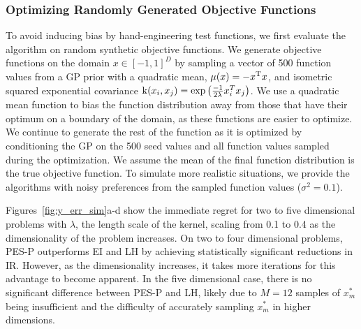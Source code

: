 \subsubsection{Optimizing Randomly Generated Objective Functions}

To avoid inducing bias by hand-engineering test functions, we first evaluate the
algorithm on random synthetic objective functions. We generate objective
functions on the domain $x \in {[-1, 1]}^D$ by sampling a vector of 500 function
values from a GP prior with a quadratic mean, $\mu(x) = - x^{\mathrm{T}} x$, and
isometric squared exponential covariance $\funcil{k}{x_i,x_j} = \exp
\left(\frac{-1}{2 \lambda} x_i^T x_j \right)$. We use a quadratic mean function
to bias the function distribution away from those that have their optimum on a
boundary of the domain, as these functions are easier to optimize. We continue
to generate the rest of the function as it is optimized by conditioning the GP
on the 500 seed values and all function values sampled during the optimization.
We assume the mean of the final function distribution is the true objective
function. To simulate more realistic situations, we provide the algorithms with
noisy preferences from the sampled function values ($\sigma^2 = 0.1$).

Figures~\ref{fig:y_err_sim}a-d show the immediate regret for two to five
dimensional problems with $\lambda$, the length scale of the kernel, scaling
from 0.1 to 0.4 as the dimensionality of the problem increases. On two to four
dimensional problems, PES-P outperforms EI and LH by achieving statistically
significant reductions in IR\@. However, as the dimensionality increases, it
takes more iterations for this advantage to become apparent. In the five
dimensional case, there is no significant difference between PES-P and LH,
likely due to $M=12$ samples of $x_m^*$ being insufficient and the difficulty of
accurately sampling $x_m^*$ in higher dimensions.

